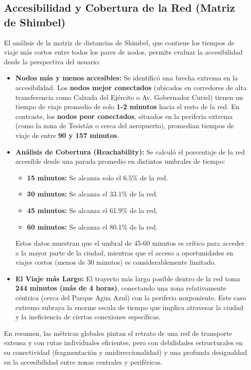     \subsection{Accesibilidad y Cobertura de la Red (Matriz de Shimbel)}
    El análisis de la matriz de distancias de Shimbel, que contiene los tiempos de viaje más cortos entre todos los pares de nodos, permite evaluar la accesibilidad desde la perspectiva del usuario:
    \begin{itemize}
        \item \textbf{Nodos más y menos accesibles:} Se identificó una brecha extrema en la accesibilidad. Los \textbf{nodos mejor conectados} (ubicados en corredores de alta transferencia como Calzada del Ejército o Av. Gobernador Curiel) tienen un tiempo de viaje promedio de solo \textbf{1-2 minutos} hacia el resto de la red. En contraste, los \textbf{nodos peor conectados}, situados en la periferia extrema (como la zona de Tesistán o cerca del aeropuerto), promedian tiempos de viaje de entre \textbf{90 y 157 minutos}.
        \item \textbf{Análisis de Cobertura (Reachability):} Se calculó el porcentaje de la red accesible desde una parada promedio en distintos umbrales de tiempo:
        \begin{itemize}
            \item \textbf{15 minutos:} Se alcanza solo el 6.5\% de la red.
            \item \textbf{30 minutos:} Se alcanza el 33.1\% de la red.
            \item \textbf{45 minutos:} Se alcanza el 61.9\% de la red.
            \item \textbf{60 minutos:} Se alcanza el 80.1\% de la red.
        \end{itemize}
        Estos datos muestran que el umbral de 45-60 minutos es crítico para acceder a la mayor parte de la ciudad, mientras que el acceso a oportunidades en viajes cortos (menos de 30 minutos) es considerablemente limitado.
        \item \textbf{El Viaje más Largo:} El trayecto más largo posible dentro de la red toma \textbf{244 minutos (más de 4 horas)}, conectando una zona relativamente céntrica (cerca del Parque Agua Azul) con la periferia norponiente. Este caso extremo subraya la enorme escala de tiempo que implica atravesar la ciudad y la ineficiencia de ciertas conexiones específicas.
    \end{itemize}

    En resumen, las métricas globales pintan el retrato de una red de transporte extensa y con rutas individuales eficientes, pero con debilidades estructurales en su conectividad (fragmentación y unidireccionalidad) y una profunda desigualdad en la accesibilidad entre zonas centrales y periféricas.

